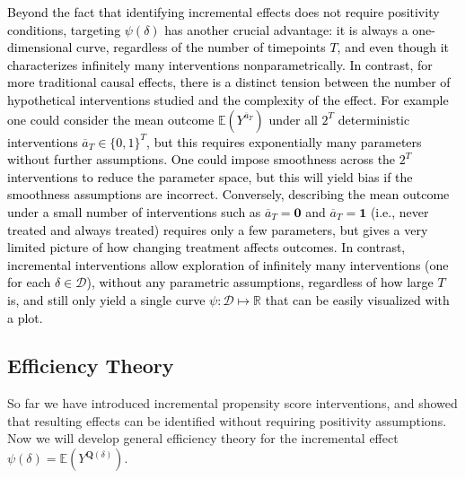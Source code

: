 \documentclass[12pt]{article}
\newcommand{\E}{\mathbb{E}}
\newcommand{\R}{\mathbb{R}}
\newcommand{\bQ}{\mathbf{Q}}
\theoremstyle{remark}
\begin{document}
\textcolor{black}{Beyond the fact that identifying incremental effects does not require positivity conditions, targeting $\psi(\delta)$ has another crucial advantage: it is always a one-dimensional curve, regardless of the number of timepoints $T$, and even though it characterizes infinitely many interventions nonparametrically. In contrast, for more traditional causal effects, there is a distinct tension between the number of hypothetical interventions studied and the complexity of the effect. For example one could consider the mean outcome $\E(Y^{\overline{a}_T})$ under all $2^T$ deterministic interventions $\overline{a}_T \in \{0,1\}^T$, but this requires exponentially many parameters without further assumptions. One could impose smoothness across the $2^T$ interventions to reduce the parameter space, but this will yield bias if the smoothness assumptions are incorrect. Conversely, describing the mean outcome under a small number of interventions such as $\overline{a}_T = \mathbf{0}$ and $\overline{a}_T=\mathbf{1}$ (i.e., never treated and always treated) requires only a few parameters, but gives a very limited picture of how changing treatment affects outcomes. In contrast, incremental interventions allow  exploration of infinitely many interventions (one for each $\delta \in \mathcal{D}$), without any parametric assumptions, regardless of how large $T$ is, and still only yield a single curve $\psi: \mathcal{D}  \mapsto \R$ that can be easily visualized with a plot. }


\subsection{Efficiency Theory}
\label{sec:eff}

So far we have introduced incremental propensity score interventions, and showed that resulting effects can be identified without requiring positivity assumptions. Now we will develop general efficiency theory for the incremental effect $\psi(\delta)=\E(Y^{\bQ(\delta)})$.
\end{document}
